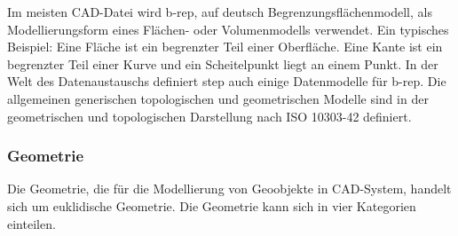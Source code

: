 \documentclass[14pt,a4paper,titlepage]{article}
\begin{document}
		\bigbreak
		Im meisten CAD-Datei wird \acf{b-rep}, auf deutsch Begrenzungsflächenmodell, als Modellierungsform eines Flächen- oder Volumenmodells verwendet. Ein typisches Beispiel: Eine Fläche ist ein begrenzter Teil einer Oberfläche. Eine Kante ist ein begrenzter Teil einer Kurve und ein Scheitelpunkt liegt an einem Punkt. In der Welt des Datenaustauschs definiert \acf{step} auch einige Datenmodelle für \acs{b-rep}. Die allgemeinen generischen topologischen und geometrischen Modelle sind in der geometrischen und topologischen Darstellung nach ISO 10303-42 definiert.\cite{b-rep}
		    
	\subsubsection{Geometrie}
		Die Geometrie, die für die Modellierung von Geoobjekte in CAD-System, handelt sich um euklidische Geometrie. Die Geometrie kann sich in vier Kategorien einteilen.
\end{document}
